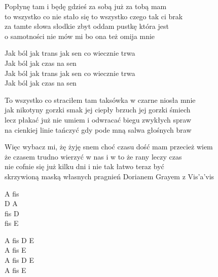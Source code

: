 \begin{text}
    Popłynę tam i będę gdzieś za sobą już za tobą mam\\
    to wszystko co nie stało się to wszystko czego tak ci brak\\
    za tamte słowa słodkie zbyt oddam pustkę która jest\\
    o samotności nie mów mi bo ona też omija mnie

    Jak ból jak trans jak sen co wiecznie trwa\\
    Jak ból jak czas na sen\\
    Jak ból jak trans jak sen co wiecznie trwa\\
    Jak ból jak czas na sen

    To wszystko co straciłem tam taksówka w czarne niosła mnie\\
    jak nikotyny gorzki smak jej ciepły brzuch jej gorzki śmiech\\
    lecz płakać już nie umiem i odwracać biegu zwykłych spraw\\
    na cienkiej linie tańczyć gdy pode mną salwa głośnych braw

    Więc wybacz mi, żę żyję snem choć czasu dość mam przecież wiem\\
    że czasem trudno wierzyć w nas i w to że rany leczy czas\\
    nie cofnie się już kilku dni i nie tak łatwo teraz być\\
    skrzywioną maską własnych pragnień Dorianem Grayem z Vis'a'vis
\end{text}
\begin{chord}
    A fis\\
    D A\\
    fis D\\
    fis E

    A fis D E\\
    A fis E\\
    A fis D E\\
    A fis E
\end{chord}